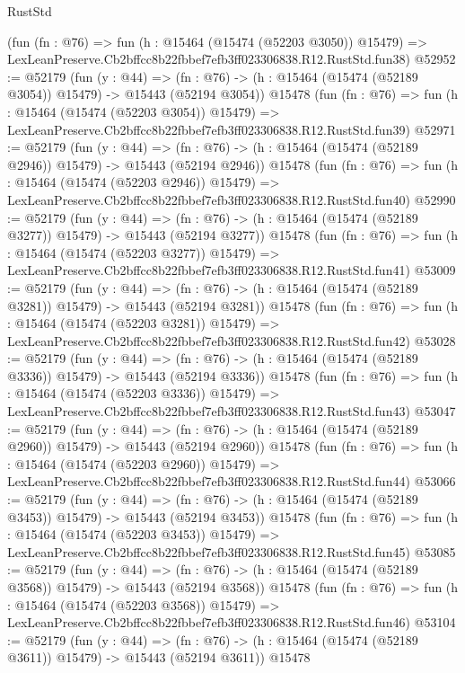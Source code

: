 \begin{lexlean}{RustStd}
\begin{coremodule}
    (fun (fn : @76) =>
    fun (h : @15464 (@15474 (@52203 @3050)) @15479) =>
    LexLeanPreserve.Cb2bffcc8b22fbbef7efb3ff023306838.R12.RustStd.fun38)
@52952 := @52179
    (fun (y : @44) =>
    (fn : @76) -> (h : @15464 (@15474 (@52189 @3054)) @15479) -> @15443 (@52194 @3054))
    @15478
    (fun (fn : @76) =>
    fun (h : @15464 (@15474 (@52203 @3054)) @15479) =>
    LexLeanPreserve.Cb2bffcc8b22fbbef7efb3ff023306838.R12.RustStd.fun39)
@52971 := @52179
    (fun (y : @44) =>
    (fn : @76) -> (h : @15464 (@15474 (@52189 @2946)) @15479) -> @15443 (@52194 @2946))
    @15478
    (fun (fn : @76) =>
    fun (h : @15464 (@15474 (@52203 @2946)) @15479) =>
    LexLeanPreserve.Cb2bffcc8b22fbbef7efb3ff023306838.R12.RustStd.fun40)
@52990 := @52179
    (fun (y : @44) =>
    (fn : @76) -> (h : @15464 (@15474 (@52189 @3277)) @15479) -> @15443 (@52194 @3277))
    @15478
    (fun (fn : @76) =>
    fun (h : @15464 (@15474 (@52203 @3277)) @15479) =>
    LexLeanPreserve.Cb2bffcc8b22fbbef7efb3ff023306838.R12.RustStd.fun41)
@53009 := @52179
    (fun (y : @44) =>
    (fn : @76) -> (h : @15464 (@15474 (@52189 @3281)) @15479) -> @15443 (@52194 @3281))
    @15478
    (fun (fn : @76) =>
    fun (h : @15464 (@15474 (@52203 @3281)) @15479) =>
    LexLeanPreserve.Cb2bffcc8b22fbbef7efb3ff023306838.R12.RustStd.fun42)
@53028 := @52179
    (fun (y : @44) =>
    (fn : @76) -> (h : @15464 (@15474 (@52189 @3336)) @15479) -> @15443 (@52194 @3336))
    @15478
    (fun (fn : @76) =>
    fun (h : @15464 (@15474 (@52203 @3336)) @15479) =>
    LexLeanPreserve.Cb2bffcc8b22fbbef7efb3ff023306838.R12.RustStd.fun43)
@53047 := @52179
    (fun (y : @44) =>
    (fn : @76) -> (h : @15464 (@15474 (@52189 @2960)) @15479) -> @15443 (@52194 @2960))
    @15478
    (fun (fn : @76) =>
    fun (h : @15464 (@15474 (@52203 @2960)) @15479) =>
    LexLeanPreserve.Cb2bffcc8b22fbbef7efb3ff023306838.R12.RustStd.fun44)
@53066 := @52179
    (fun (y : @44) =>
    (fn : @76) -> (h : @15464 (@15474 (@52189 @3453)) @15479) -> @15443 (@52194 @3453))
    @15478
    (fun (fn : @76) =>
    fun (h : @15464 (@15474 (@52203 @3453)) @15479) =>
    LexLeanPreserve.Cb2bffcc8b22fbbef7efb3ff023306838.R12.RustStd.fun45)
@53085 := @52179
    (fun (y : @44) =>
    (fn : @76) -> (h : @15464 (@15474 (@52189 @3568)) @15479) -> @15443 (@52194 @3568))
    @15478
    (fun (fn : @76) =>
    fun (h : @15464 (@15474 (@52203 @3568)) @15479) =>
    LexLeanPreserve.Cb2bffcc8b22fbbef7efb3ff023306838.R12.RustStd.fun46)
@53104 := @52179
    (fun (y : @44) =>
    (fn : @76) -> (h : @15464 (@15474 (@52189 @3611)) @15479) -> @15443 (@52194 @3611))
    @15478

\end{coremodule}
\end{lexlean}
